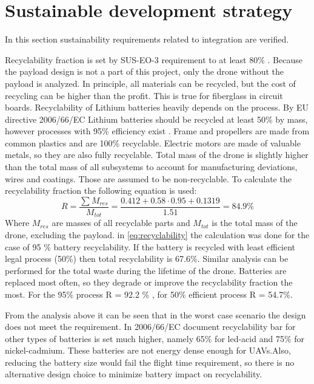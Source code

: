 \section{Sustainable development strategy}
In this section sustainability requirements related to integration are verified. 

Recyclability fraction is set by SUS-EO-3 requirement to at least 80\% .
Because the payload design is not a part of this project, only the drone without the payload is analyzed. In principle, all materials can be recycled, but the cost of recycling can be higher than the profit. This is true for fiberglass in circuit boards. Recyclability of Lithium batteries heavily depends on the process. By EU directive 2006/66/EC Lithium batteries should be recycled at least 50\% by mass, however processes with 95\% efficiency exist \cite{battery_recycling_95}. Frame and propellers are made from common plastics and are 100\% recyclable. Electric motors are made of valuable metals, so they are also fully recyclable. Total mass of the drone is slightly higher than the total mass of all subsystems to account for manufacturing deviations, wires and coatings. Those are assumed to be non-recyclable. To calculate the recyclability fraction the following equation is used:
\begin{equation}
    R = \frac{\sum M_{res}}{M_{tot}} = \frac{0.412 + 0.58 \cdot 0.95 + 0.1319}{1.51} = 84.9\%
    \label{eq:recyclability}
\end{equation}
Where $M_{res}$  are masses of all recyclable parts and $M_{tot}$ is the total mass of the drone, excluding the payload. in \autoref{eq:recyclability} the calculation was done for the case of 95 \% battery recyclability. If the battery is recycled with least efficient legal process (50\%) then total recyclability is 67.6\%. Similar analysis can be performed for the total waste during the lifetime of the drone. Batteries are replaced most often, so they degrade or improve the recyclability fraction the most. For the 95\% process R = 92.2 \% , for 50\% efficient process R = 54.7\%. 

From the analysis above it can be seen that in the worst case scenario the design does not meet the requirement. In 2006/66/EC document recyclability bar for other types of batteries is set much higher, namely 65\% for led-acid and 75\% for nickel-cadmium. These batteries are not energy dense enough for UAVs.Also, reducing the battery size would fail the flight time requirement, so there is no alternative design choice to minimize battery impact on recyclability. 

